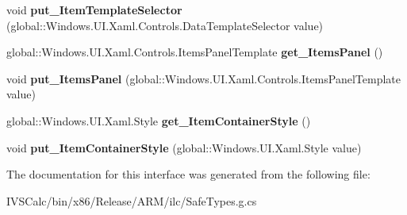 \begin{DoxyCompactItemize}
\mbox{\label{interface_windows_1_1_u_i_1_1_xaml_1_1_controls_1_1_i_items_control_aa561637adcee5715eed974d70e6d813a}} 
void {\bfseries put\+\_\+\+Item\+Template\+Selector} (global\+::\+Windows.\+U\+I.\+Xaml.\+Controls.\+Data\+Template\+Selector value)
\item 
\mbox{\label{interface_windows_1_1_u_i_1_1_xaml_1_1_controls_1_1_i_items_control_ab7176badfe60bbefeb142105c2d8637a}} 
global\+::\+Windows.\+U\+I.\+Xaml.\+Controls.\+Items\+Panel\+Template {\bfseries get\+\_\+\+Items\+Panel} ()
\item 
\mbox{\label{interface_windows_1_1_u_i_1_1_xaml_1_1_controls_1_1_i_items_control_af7be75b1cc3df63d782025e03364f6ea}} 
void {\bfseries put\+\_\+\+Items\+Panel} (global\+::\+Windows.\+U\+I.\+Xaml.\+Controls.\+Items\+Panel\+Template value)
\item 
\mbox{\label{interface_windows_1_1_u_i_1_1_xaml_1_1_controls_1_1_i_items_control_a4459707c1f50a2985881f9d3053ab38f}} 
global\+::\+Windows.\+U\+I.\+Xaml.\+Style {\bfseries get\+\_\+\+Item\+Container\+Style} ()
\item 
\mbox{\label{interface_windows_1_1_u_i_1_1_xaml_1_1_controls_1_1_i_items_control_ac812f5bc0cf3f55197783982db3f878d}} 
void {\bfseries put\+\_\+\+Item\+Container\+Style} (global\+::\+Windows.\+U\+I.\+Xaml.\+Style value)
\end{DoxyCompactItemize}


The documentation for this interface was generated from the following file\+:\begin{DoxyCompactItemize}
\item 
I\+V\+S\+Calc/bin/x86/\+Release/\+A\+R\+M/ilc/Safe\+Types.\+g.\+cs\end{DoxyCompactItemize}
